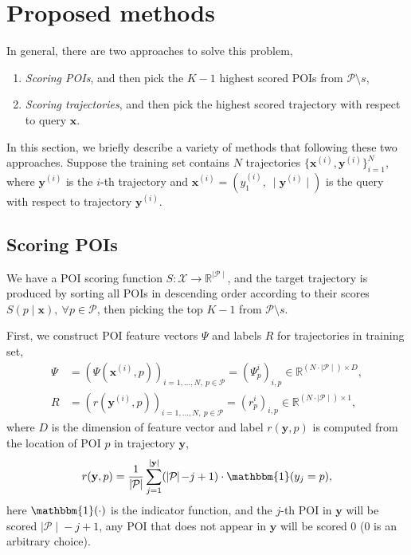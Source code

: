 \section{Proposed methods}
\label{sec:methods}

In general, there are two approaches to solve this problem,
\begin{enumerate}
\item \emph{Scoring POIs}, and then pick the $K-1$ highest scored POIs from $\mathcal{P} \setminus s$,
\item \emph{Scoring trajectories}, and then pick the highest scored trajectory with respect to query $\mathbf{x}$.
\end{enumerate}

In this section, we briefly describe a variety of methods that following these two approaches.
Suppose the training set contains $N$ trajectories 
$\{ \mathbf{x}^{(i)}, \mathbf{y}^{(i)} \}_{i=1}^N$,
where $\mathbf{y}^{(i)}$ is the $i$-th trajectory and $\mathbf{x}^{(i)} = (y_1^{(i)},~ \mid\!\! \mathbf{y}^{(i)} \!\!\mid)$ is the query 
with respect to trajectory $\mathbf{y}^{(i)}$.



\subsection{Scoring POIs}
\label{sec:scoring_point}

We have a POI scoring function $S: \mathcal{X} \to \mathbb{R}^{\mid \mathcal{P} \mid}$, 
and the target trajectory is produced by sorting all POIs in descending order according to their scores 
$S(p \mid \mathbf{x}),~ \forall p \in \mathcal{P}$,
then picking the top $K-1$ from $\mathcal{P} \setminus s$.

First, we construct POI feature vectors $\Psi$ and labels $R$ for trajectories in training set, 
\begin{align*}
\Psi &= \left( \Psi(\mathbf{x}^{(i)}, p) \right)_{i=1,\dots,N,~p \in \mathcal{P}} = \left( \Psi_p^i \right)_{i,p}
        \in \mathbb{R}^{(N \cdot \mid \mathcal{P} \mid) \times D}, \\
   R &= \left( r(\mathbf{y}^{(i)}, p) \right)_{i=1,\dots,N,~p \in \mathcal{P}} = \left(r_p^i \right)_{i,p}
        \in \mathbb{R}^{(N \cdot \mid \mathcal{P} \mid) \times 1},
\end{align*}
where $D$ is the dimension of feature vector and label $r(\mathbf{y}, p)$ is computed from the location of POI $p$ in trajectory $\mathbf{y}$,
\begin{equation*}
r(\mathbf{y}, p) = \frac{1}{\mid\!\! \mathcal{P} \!\!\mid} 
                   \sum_{j=1}^{\mid \mathbf{y} \mid} (\mid\!\! \mathcal{P} \!\!\mid\! - j + 1) \cdot \mathbbm{1}(y_j = p),
\end{equation*}
here $\mathbbm{1}(\cdot)$ is the indicator function, and the $j$-th POI in $\mathbf{y}$ will be scored $\mid\!\! \mathcal{P} \!\!\mid\! - j + 1$, 
any POI that does not appear in $\mathbf{y}$ will be scored $0$ ($0$ is an arbitrary choice).



